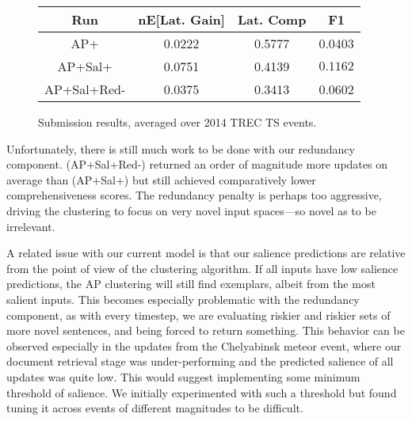\documentclass{sig-alternate}
\begin{document}
\begin{figure}
\centering
\begin{tabular}{| c | c | c | c |}
\hline
\textbf{Run} & \textbf{nE[Lat. Gain]} & \textbf{Lat. Comp} & \textbf{F1} \\
\hline
AP+ & 0.0222  & 0.5777 & 0.0403\\
\hline
AP+Sal+ & 0.0751 &  0.4139 & $\mathbf{0.1162}$\\
\hline
AP+Sal+Red- & 0.0375 & 0.3413 & 0.0602\\
\hline
\end{tabular}
\caption{Submission results, averaged over 2014 TREC TS events.}
\end{figure}

Unfortunately, there is still much work to be done with our redundancy 
component. (AP+Sal+Red-) returned an order of magnitude more updates on 
average than (AP+Sal+) but still achieved comparatively lower comprehensiveness
scores. The redundancy penalty is perhaps too aggressive, driving the 
clustering to focus on very novel input spaces---so novel as to be 
irrelevant. 

A related issue with our current model is that our salience predictions
are relative from the point of view of the clustering algorithm. If all inputs
have low salience predictions, the AP clustering will still find exemplars, 
albeit from the most salient inputs. This becomes especially problematic 
with the redundancy component, as with every timestep, we are evaluating 
riskier and riskier sets of more novel sentences, and being forced to return
something. This behavior can be observed especially in the updates from the
Chelyabinsk meteor event, where our document retrieval stage was 
under-performing and the predicted salience of all updates was quite low.
This would suggest implementing some minimum threshold of salience. We
initially experimented with such a threshold but found tuning it across 
events of different magnitudes to be difficult. 




%
%
\end{document}
